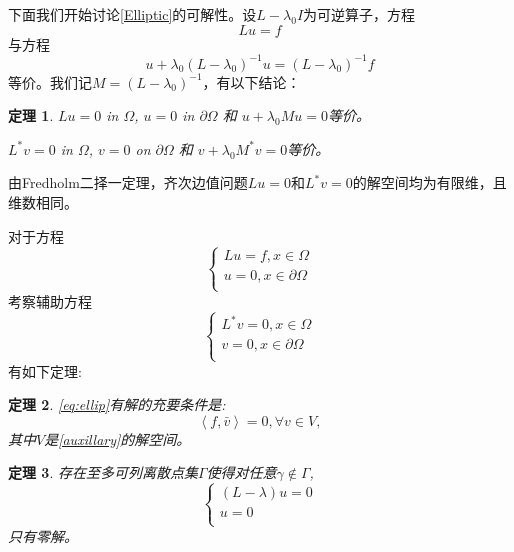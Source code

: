 \documentclass[a4paper]{ctexart}
\newtheorem{Thm}{\hspace{2em}定理}[section]
\newcommand{\innerprod}[2]{\left<#1,#2\right>}
\begin{document}
下面我们开始讨论\ref{Elliptic}的可解性。设$L-\lambda_{0}I$为可逆算子，方程
\begin{equation}
    Lu=f
\end{equation}
与方程
\begin{equation}
    u+\lambda_{0}(L-\lambda_{0})^{-1}u=(L-\lambda_{0})^{-1}f
\end{equation}
等价。我们记$M=(L-\lambda_{0})^{-1}$，有以下结论：
\begin{Thm}
    $Lu=0$ in $\Omega$, $u=0$ in $\partial\Omega$ 和 $u+\lambda_{0}Mu=0$等价。

    $L^{*}v=0$ in $\Omega$, $v=0$ on $\partial\Omega$ 和 $v+\lambda_{0}M^{*}v=0$等价。
\end{Thm}
由Fredholm二择一定理，齐次边值问题$Lu=0$和$L^{*}v=0$的解空间均为有限维，且维数相同。

对于方程
\begin{equation}
    \label{eq:ellip}
    \left\{
    \begin{aligned}
        Lu=f,x\in\Omega\\
        u=0,x\in\partial\Omega\\
    \end{aligned}
    \right.
\end{equation}
考察辅助方程
\begin{equation}
    \label{auxillary}
    \left\{
        \begin{aligned}
    L^{*}v=0,x\in\Omega\\
    v=0,x\in\partial\Omega\\
        \end{aligned}
    \right.
\end{equation}
有如下定理:
\begin{Thm}
    \eqref{eq:ellip}有解的充要条件是:
    \begin{equation}
        \innerprod{f}{\bar{v}}=0,\forall v\in V,
    \end{equation}
    其中$V$是\eqref{auxillary}的解空间。
\end{Thm}
\begin{Thm}
    存在至多可列离散点集$\varGamma$使得对任意$\gamma\notin\varGamma$, 
    \begin{equation}
        \left\{
            \begin{aligned}
                (L-\lambda)u=0\\
                u=0\\
            \end{aligned}
        \right.
    \end{equation}
    只有零解。
\end{Thm}
\end{document}
